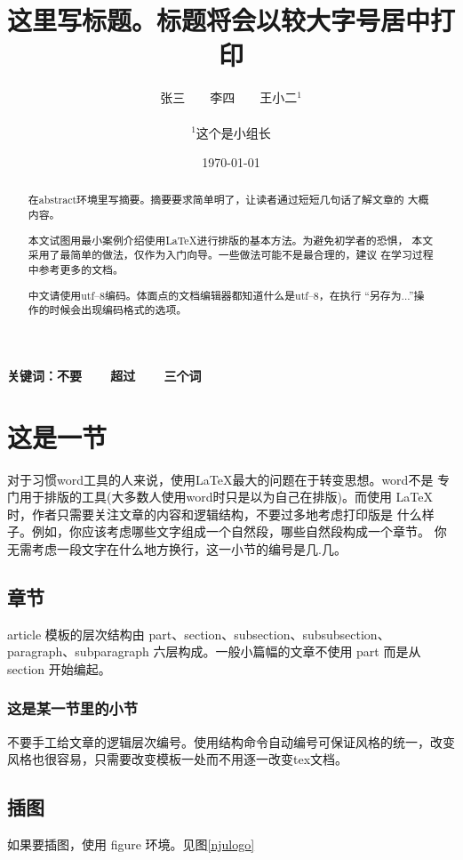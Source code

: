 \documentclass{article}
\title{
    这里写标题。标题将会以较大字号居中打印
}
\author{
    张三~~~~李四~~~~王小二$^1$
 \\ \\
$^1$这个是小组长
}
\date{\today}
\begin{document}
\maketitle     %

\begin{abstract}
在abstract环境里写摘要。摘要要求简单明了，让读者通过短短几句话了解文章的
大概内容。

本文试图用最小案例介绍使用\LaTeX 进行排版的基本方法。为避免初学者的恐惧，
本文采用了最简单的做法，仅作为入门向导。一些做法可能不是最合理的，建议
在学习过程中参考更多的文档\cite{tex}。

中文请使用utf--8编码。体面点的文档编辑器都知道什么是utf--8，在执行
``另存为...''操作的时候会出现编码格式的选项。
  
\end{abstract}

\textbf{关键词：不要~~~~超过~~~~三个词}

\section{这是一节}

对于习惯word工具的人来说，使用\LaTeX 最大的问题在于转变思想。word不是
专门用于排版的工具(大多数人使用word时只是以为自己在排版)。而使用
\LaTeX 时，作者只需要关注文章的内容和逻辑结构，不要过多地考虑打印版是
什么样子。例如，你应该考虑哪些文字组成一个自然段，哪些自然段构成一个章节。
你无需考虑一段文字在什么地方换行，这一小节的编号是几.几。

\subsection{章节}
article 模板的层次结构由 part、section、subsection、subsubsection、
paragraph、subparagraph 六层构成。一般小篇幅的文章不使用 part 而是从
section 开始编起。

\subsubsection{这是某一节里的小节}
不要手工给文章的逻辑层次编号。使用结构命令自动编号可保证风格的统一，改变
风格也很容易，只需要改变模板一处而不用逐一改变tex文档。

\subsection{插图}
如果要插图，使用 figure 环境。见图\ref{njulogo}
\end{document}
